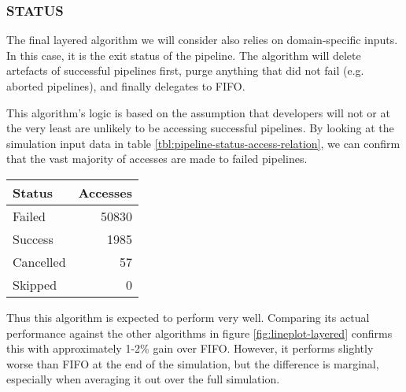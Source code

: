     \subsubsection{STATUS}
        The final layered algorithm we will consider also relies on domain-specific inputs. In this case, it is the exit status of the pipeline. The algorithm will delete artefacts of successful pipelines first, purge anything that did not fail (e.g. aborted pipelines), and finally delegates to FIFO.
        
        This algorithm's logic is based on the assumption that developers will not or at the very least are unlikely to be accessing successful pipelines. By looking at the simulation input data in table \ref{tbl:pipeline-status-access-relation}, we can confirm that the vast majority of accesses are made to failed pipelines.
        
        \begin{Figure}
            \begin{center}
                \begin{tabular}{ l | r }
                    Status & Accesses \\ \hline
                    Failed & 50830\\
                    Success & 1985\\
                    Cancelled & 57\\
                    Skipped & 0\\
                \end{tabular}
            \end{center}
            \label{tbl:pipeline-status-access-relation}
        \end{Figure}
        
        Thus this algorithm is expected to perform very well. Comparing its actual performance against the other algorithms in figure \ref{fig:lineplot-layered} confirms this with approximately 1-2\% gain over FIFO. However, it performs slightly worse than FIFO at the end of the simulation, but the difference is marginal, especially when averaging it out over the full simulation.
